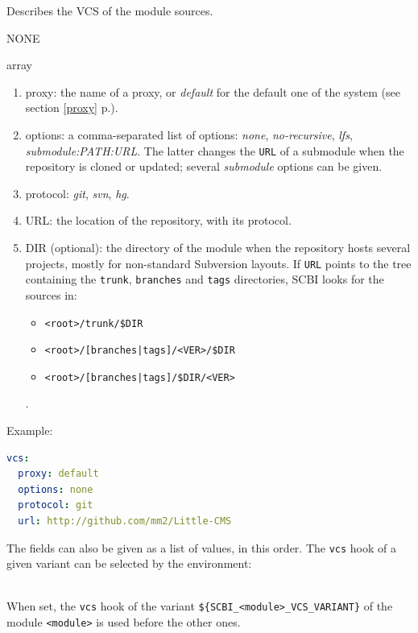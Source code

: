 \documentclass[a4paper,12pt,twoside]{article}
\newcommand{\code}[1]{\texttt{#1}}
\renewcommand{\emph}[1]{\textit{#1}}
\newcommand{\seeref}[1]{see section \ref{#1} p.\pageref{#1}}
\begin{document}
\begin{description}[font=\large\texttt]

	\item[vcs {[}<variant>{]}] Describes the VCS of the module sources.
	\begin{description}[font=\textit,style=standard]
		\item[parameter] \tabto{2cm} NONE
		\item[return] \tabto{2cm} array
		\begin{enumerate}
			\item proxy: the name of a proxy, or \emph{default} for the default one of the system (\seeref{proxy}).
			\item options: a comma-separated list of options: \emph{none}, \emph{no-recursive}, \emph{lfs}, \emph{submodule:PATH:URL}. The latter changes the \code{URL} of a submodule when the repository is cloned or updated; several \emph{submodule} options can be given.
			\item protocol: \emph{git}, \emph{svn}, \emph{hg}.
			\item URL: the location of the repository, with its protocol.
			\item DIR (optional): the directory of the module when the repository hosts several projects, mostly for non-standard Subversion layouts. If \code{URL} points to the tree containing the \code{trunk}, \code{branches} and \code{tags} directories, SCBI looks for the sources in:
			\begin{itemize}
				\item \code{<root>/trunk/\$DIR}
				\item \code{<root>/[branches|tags]/<VER>/\$DIR}
				\item \code{<root>/[branches|tags]/\$DIR/<VER>}
			\end{itemize}.
		\end{enumerate}
	\end{description}

	Example:
	\begin{lstlisting}[language={yaml}]
vcs:
  proxy: default
  options: none
  protocol: git
  url: http://github.com/mm2/Little-CMS
\end{lstlisting}

	The fields can also be given as a list of values, in this order. The
	\code{vcs} hook of a given variant can be selected by the environment:

	\begin{description}[style=standard]
		\item[\code{SCBI\_<module>\_VCS\_VARIANT}] \hfill \\
		When set, the \code{vcs} hook of the variant \code{\$\{SCBI\_<module>\_VCS\_VARIANT\}} of the module \code{<module>} is used before the other ones.


\end{description}
\end{description}
\end{document}

